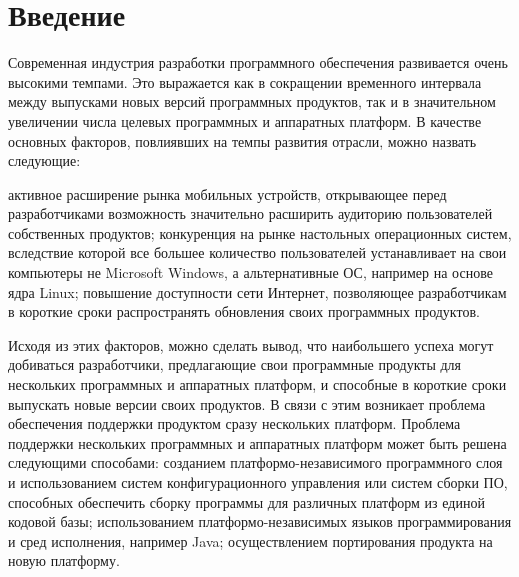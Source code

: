 \tableofcontents
\newpage

\section{Введение}
Современная индустрия разработки программного обеспечения развивается очень высокими темпами. Это выражается как в сокращении временного интервала между выпусками новых версий программных продуктов, так и в значительном увеличении числа целевых программных и аппаратных платформ. В качестве основных факторов, повлиявших на темпы развития отрасли, можно назвать следующие:

активное расширение рынка мобильных устройств, открывающее перед разработчиками возможность значительно расширить аудиторию пользователей собственных продуктов;
конкуренция на рынке настольных операционных систем, вследствие которой все большее количество пользователей устанавливает на свои компьютеры не Microsoft Windows, а альтернативные ОС, например на основе ядра Linux;
повышение доступности сети Интернет, позволяющее разработчикам в короткие сроки распространять обновления своих программных продуктов.

Исходя из этих факторов, можно сделать вывод, что наибольшего успеха могут добиваться разработчики, предлагающие свои программные продукты для нескольких программных и аппаратных платформ, и способные в короткие сроки выпускать новые версии своих продуктов. В связи с этим возникает проблема обеспечения поддержки продуктом сразу нескольких платформ.
Проблема поддержки нескольких программных и аппаратных платформ может быть решена следующими способами:
созданием платформо-независимого программного слоя и использованием систем конфигурационного управления или систем сборки ПО, способных обеспечить сборку программы для различных платформ из единой кодовой базы;
использованием платформо-независимых языков программирования и сред исполнения, например Java;
осуществлением портирования продукта на новую платформу.


